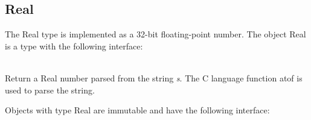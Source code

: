 \subsection{Real}
\label{builtin Real}
The Real type is implemented as a 32-bit floating-point number.
The object Real is a type with the following interface:

\begin{desc}
  \item[\kw{function} literal\/\LB{}s \CO{} \tn{String}\/\RB{} \returns{} \/\LB{}\tn{Real}\/\RB{}]~\\
    Return a Real number parsed from the string {\it s}.  The C language
    function atof is used to parse the string.
\end{desc}

\noindent Objects with type Real are immutable and have the following
interface:

